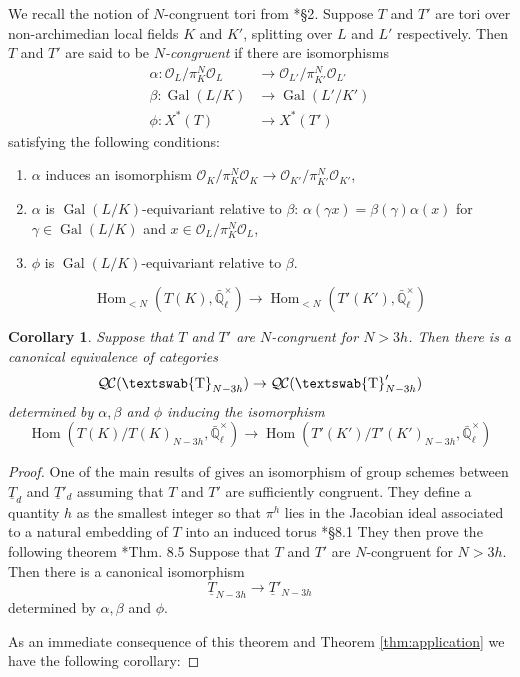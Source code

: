 \documentclass[11pt]{amsart}
\newcommand{\mathswab}[1]{\operatorname{\textswab{#1}}}
\theoremstyle{plain}
\newtheorem{corollary}[theorem]{Corollary}
\theoremstyle{definition}
\theoremstyle{remark}
\newcommand{\EE}{\mathbb{\bar Q}_\ell}
\newcommand{\OK}{\mathcal{O}_K}
\newcommand{\OL}{\mathcal{O}_L}
\newcommand{\OO}[1]{\mathcal{O}_{#1}}
\newcommand{\EEx}{\EE^\times}
\DeclareMathOperator{\Gal}{Gal}
\DeclareMathOperator{\Hom}{Hom}
\newcommand{\GN}[1]{\mathswab{#1}}
\newcommand{\TT}{\underline{T}}
\newcommand{\QC}{{\mathcal{Q\hskip-0.8pt C}}}
\begin{document}
We recall the notion of $N$-congruent tori from  \cite{CY}*{\S 2}.  Suppose $T$ and $T'$
are tori over non-archimedian local fields $K$ and $K'$, splitting over $L$ and $L'$ respectively.
Then $T$ and $T'$ are said to be \emph{$N$-congruent} if there are isomorphisms
 \begin{align*}
  \alpha : \OL/\pi_K^N \OL &\to \OO{L'}/\pi_{K'}^N \OO{L'} \\
  \beta : \Gal(L/K) &\to \Gal(L'/K') \\
  \phi : X^*(T) &\to X^*(T')
 \end{align*}
 satisfying the following conditions:
 \begin{enumerate}
  \item $\alpha$ induces an isomorphism $\OK/\pi_K^N \OK \to \OO{K'}/\pi_{K'}^N \OO{K'}$,
  \item $\alpha$ is $\Gal(L/K)$-equivariant relative to $\beta$: $\alpha(\gamma x) = \beta(\gamma) \alpha(x)$
  for $\gamma \in \Gal(L/K)$ and $x \in \OL/\pi_K^N \OL$,
  \item $\phi$ is $\Gal(L/K)$-equivariant relative to $\beta$.
 \end{enumerate}
\[
  \Hom_{<N}(T(K), \EEx) \to \Hom_{<N}(T'(K'),\EEx)
 \]

\begin{corollary}
 Suppose that $T$ and $T'$ are $N$-congruent for $N > 3h$.  Then there is a canonical equivalence of categories
 \[
  \QC(\GN{T}_{N-3h}) \to \QC(\GN{T}'_{N-3h})
 \]
 determined by $\alpha, \beta$ and $\phi$ inducing the isomorphism
 \[
  \Hom(T(K) / T(K)_{N-3h}, \EEx) \to \Hom(T'(K') / T'(K')_{N-3h}, \EEx)
 \]
\end{corollary}

\begin{proof}
One of the main results of \cite{CY} gives an isomorphism of group schemes between
$\TT_d$ and $\TT'_d$ assuming that $T$ and $T'$ are sufficiently congruent.
They define a quantity $h$ as the smallest integer so that $\pi^h$ lies in the
Jacobian ideal associated to a natural embedding of $T$ into an induced torus \cite{CY}*{\S 8.1}
They then prove the following theorem \cite{CY}*{Thm. 8.5}
 Suppose that $T$ and $T'$ are $N$-congruent for $N > 3h$.  Then there is a canonical isomorphism
 \[
  \TT_{N-3h} \to \TT'_{N-3h}
 \]
 determined by $\alpha, \beta$ and $\phi$.


As an immediate consequence of this theorem and Theorem \ref{thm:application} we have the following corollary:
\end{proof}
\end{document}
